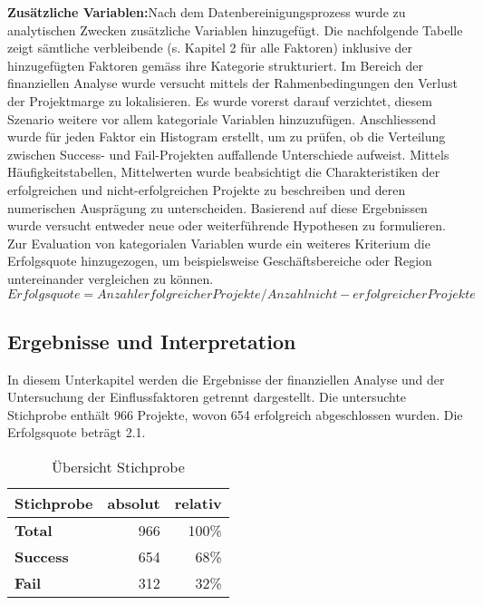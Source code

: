 \newline\newline
\textbf{Zusätzliche Variablen:}Nach dem Datenbereinigungsprozess wurde zu analytischen Zwecken zusätzliche Variablen hinzugefügt. Die nachfolgende Tabelle zeigt sämtliche verbleibende (s. Kapitel 2 für alle Faktoren) inklusive der hinzugefügten Faktoren gemäss ihre Kategorie strukturiert. Im Bereich der finanziellen Analyse wurde versucht mittels der Rahmenbedingungen den Verlust der Projektmarge zu lokalisieren. Es wurde vorerst darauf verzichtet, diesem Szenario weitere vor allem kategoriale Variablen hinzuzufügen. Anschliessend wurde für jeden Faktor ein Histogram erstellt, um zu prüfen, ob die Verteilung zwischen Success- und Fail-Projekten auffallende Unterschiede aufweist. Mittels Häufigkeitstabellen, Mittelwerten wurde beabsichtigt die Charakteristiken der erfolgreichen und nicht-erfolgreichen Projekte zu beschreiben und deren numerischen Ausprägung zu unterscheiden. Basierend auf diese Ergebnissen wurde versucht entweder neue oder weiterführende Hypothesen zu formulieren. Zur Evaluation von kategorialen Variablen wurde ein weiteres Kriterium die Erfolgsquote hinzugezogen, um beispielsweise Geschäftsbereiche oder Region untereinander vergleichen zu können. 
\newline\newline $Erfolgsquote = Anzahl erfolgreicher Projekte/Anzahl nicht-erfolgreicher Projekte$
\newline\newline
\subsection{Ergebnisse und Interpretation}
In diesem Unterkapitel werden die Ergebnisse der finanziellen Analyse und der Untersuchung der Einflussfaktoren getrennt dargestellt. Die untersuchte Stichprobe enthält 966 Projekte, wovon 654 erfolgreich abgeschlossen wurden. Die Erfolgsquote beträgt 2.1.
\begin{table}[htbp]
	\centering
	\caption{Übersicht Stichprobe}
	\begin{tabular} {l|r|r}
		\textbf{Stichprobe} & \textbf{absolut} & \textbf{relativ} \\\hline
		\textbf{Total} & 966 & 100\% \\
		\textbf{Success} & 654 & 68\% \\
		\textbf{Fail} & 312 & 32\% \\
	\end{tabular}
\end{table}
\newpage

